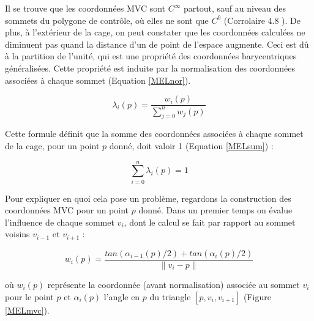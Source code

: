 Il se trouve que les coordonnées MVC sont $C^\infty$ partout, sauf au
niveau des sommets du polygone de contrôle, où elles ne sont que $C^0$
(Corrolaire 4.8 \cite{HF06}). De plus, à l'extérieur de la cage, on
peut constater que les coordonnées calculées ne diminuent pas quand la
distance d'un de point de l'espace augmente. Ceci est dû à la
partition de l'unité, qui est une propriété des coordonnées
barycentriques généralisées. Cette propriété est induite par la
normalisation des coordonnées associées à chaque sommet (Equation
\ref{MELnor}).

\begin{equation}
  \lambda_i(p) = \frac{w_i(p)}{\sum_{j=0}^n w_j(p)}
  \label{MELnor}
\end{equation}

Cette formule définit que la somme des coordonnées associées à chaque
sommet de la cage, pour un point $p$ donné, doit valoir 1 (Equation
\ref{MELsum}) :

\begin{equation}
  \sum_{i=0}^n \lambda_i(p) = 1
  \label{MELsum}
\end{equation}

Pour expliquer en quoi cela pose un problème, regardons la
construction des coordonnées MVC pour un point $p$ donné. Dans un
premier temps on évalue l'influence de chaque sommet $v_i$, dont le
calcul se fait par rapport au sommet voisins $v_{i-1}$ et $v_{i+1}$ :

\begin{equation}
  w_i(p) = \frac{tan(\alpha_{i-1}(p)/2) + tan(\alpha_{i}(p)/2)}{\|v_i - p\|}
\end{equation}

où $w_i(p)$ représente la coordonnée (avant normalisation) associée au
sommet $v_i$ pour le point $p$ et $\alpha_i(p)$ l'angle en $p$ du
triangle $[p,v_i,v_{i+1}]$ (Figure \ref{MELmvc}).

